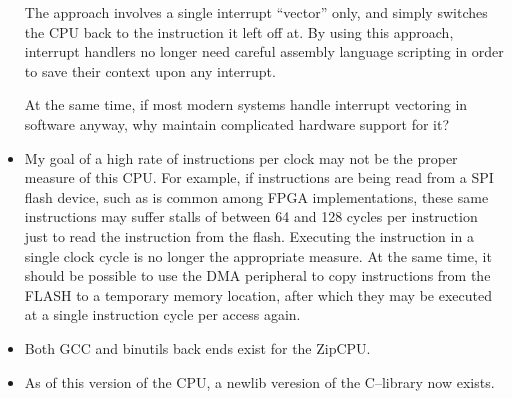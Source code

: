 \documentclass{gqtekspec}
\begin{document}
\begin{itemize}
	The approach involves a single interrupt ``vector'' only, and simply
	switches the CPU back to the instruction it left off at.  By using
	this approach, interrupt handlers no longer need careful assembly
	language scripting in order to save their context upon any interrupt.

	At the same time, if most modern systems handle interrupt vectoring in
	software anyway, why maintain complicated hardware support for it?

\item My goal of a high rate of instructions per clock may not be the proper
	measure of this CPU. For example, if instructions are being read from a
	SPI flash device, such as is common among FPGA implementations, these
	same instructions may suffer stalls of between 64 and 128 cycles per
	instruction just to read the instruction from the flash. Executing the
	instruction in a single clock cycle is no longer the appropriate
	measure. At the same time, it should be possible to use the DMA
	peripheral to copy instructions from the FLASH to a temporary memory
	location, after which they may be executed at a single instruction
	cycle per access again. 

\item Both GCC and binutils back ends exist for the ZipCPU.
\item As of this version of the CPU, a newlib veresion of the C--library
	now exists.
\end{itemize}
\end{document}
